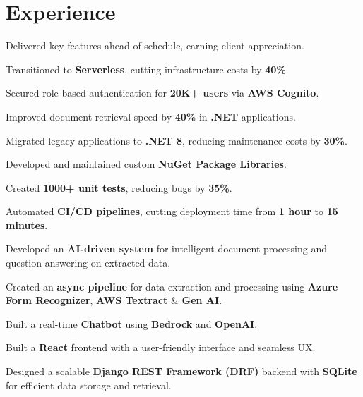 \documentclass[]{deedy-resume-reversed}
\begin{document}
\begin{minipage}[t]{0.60\textwidth}


\section{Experience}

\vspace{\topsep}
\begin{tightemize}
\item Delivered key features ahead of schedule, earning client appreciation.
\item Transitioned to \textbf{Serverless}, cutting infrastructure costs by \textbf{40\%}.
\item Secured role-based authentication for \textbf{20K+ users} via \textbf{AWS Cognito}.
\item Improved document retrieval speed by \textbf{40\%} in \textbf{.NET} applications.
\item Migrated legacy applications to \textbf{.NET 8}, reducing maintenance costs by \textbf{30\%}.
\item Developed and maintained custom \textbf{NuGet Package Libraries}.
\item Created \textbf{1000+ unit tests}, reducing bugs by \textbf{35\%}.
\item Automated \textbf{CI/CD pipelines}, cutting deployment time from \textbf{1 hour} to \textbf{15 minutes}.
\end{tightemize}
\sectionsep

\begin{tightemize}
\item Developed an \textbf{AI-driven system} for intelligent document processing and question-answering on extracted data.
\item Created an \textbf{async pipeline} for data extraction and processing using \textbf{Azure Form Recognizer}, \textbf{AWS Textract} \& \textbf{Gen AI}.
\item Built a real-time \textbf{Chatbot} using \textbf{Bedrock} and \textbf{OpenAI}.
\item Built a \textbf{React} frontend with a user-friendly interface and seamless UX.
\item Designed a scalable \textbf{Django REST Framework (DRF)} backend with \textbf{SQLite} for efficient data storage and retrieval.
\end{tightemize}
\sectionsep



\end{minipage}
\end{document}
